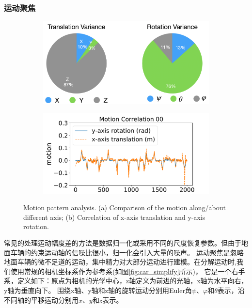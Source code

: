 \subsubsection{运动聚焦}
\label{sec:motion_focus}
\begin{figure}[ht]
    \centering
    \begin{subfigure}[b]{0.225\textwidth}
        \includegraphics[width=\textwidth]{datavo/motion_dis.png}
        \caption{}
        \label{fig:motion_dis} 
    \end{subfigure}
    \begin{subfigure}[b]{0.225\textwidth}
        \includegraphics[width=\textwidth]{datavo/rotation_corr.pdf}
        \caption{}
        \label{fig:rotation_corr}
    \end{subfigure}
    \caption{Motion pattern analysis. (a) Comparison of the motion 
    along/about different axis; (b) Correlation of x-axis translation and y-axis rotation.}
\end{figure}

常见的处理运动幅度差的方法是数据归一化或采用不同的尺度恢复参数\cite{wang2017deepvo}。但由于地面车辆的约束运动轴的信噪比很小，归一化会引入大量的噪声。
运动聚焦是忽略地面车辆的微不足道的运动，集中精力对大部分运动进行建模。在分解运动时,我们使用常规的相机坐标系作为参考系(如图\ref{fig:car_simplify}所示)，
它是一个右手系，定义如下：原点为相机的光学中心，z轴定义为前进的光轴，x轴为水平向右，y轴为垂直向下。
围绕x轴、y轴和z轴的旋转运动分别用Euler角$\psi$、$\varphi$和$\theta$表示，沿不同轴的平移运动分别用$x$、$y$和$z$表示。

